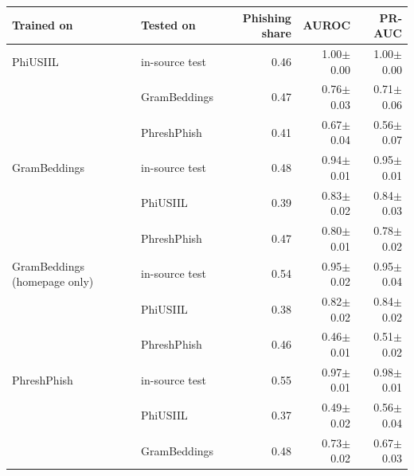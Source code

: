 {\footnotesize
\begin{tabular}{llrrr}
\toprule
\textbf{Trained on} & \textbf{Tested on} & \textbf{Phishing share} & \textbf{AUROC} & \textbf{PR-AUC} \\
\midrule
PhiUSIIL & in-source test & 0.46 & 1.00$\pm$0.00 & 1.00$\pm$0.00 \\
 & GramBeddings & 0.47 & 0.76$\pm$0.03 & 0.71$\pm$0.06 \\
 & PhreshPhish & 0.41 & 0.67$\pm$0.04 & 0.56$\pm$0.07 \\
\addlinespace
GramBeddings & in-source test & 0.48 & 0.94$\pm$0.01 & 0.95$\pm$0.01 \\
 & PhiUSIIL & 0.39 & 0.83$\pm$0.02 & 0.84$\pm$0.03 \\
 & PhreshPhish & 0.47 & 0.80$\pm$0.01 & 0.78$\pm$0.02 \\
\addlinespace
GramBeddings (homepage only) & in-source test & 0.54 & 0.95$\pm$0.02 & 0.95$\pm$0.04 \\
 & PhiUSIIL & 0.38 & 0.82$\pm$0.02 & 0.84$\pm$0.02 \\
 & PhreshPhish & 0.46 & 0.46$\pm$0.01 & 0.51$\pm$0.02 \\
\addlinespace
PhreshPhish & in-source test & 0.55 & 0.97$\pm$0.01 & 0.98$\pm$0.01 \\
 & PhiUSIIL & 0.37 & 0.49$\pm$0.02 & 0.56$\pm$0.04 \\
 & GramBeddings & 0.48 & 0.73$\pm$0.02 & 0.67$\pm$0.03 \\
\bottomrule
\end{tabular}
}
